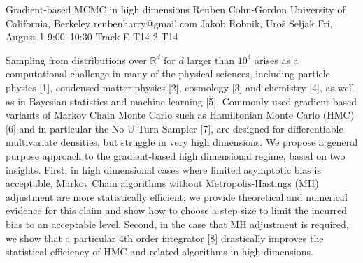 \begin{talk}
  {Gradient-based MCMC in high dimensions}%
  {Reuben Cohn-Gordon}%
  {University of California, Berkeley}%
  {reubenharry@gmail.com}%
  {Jakob Robnik, Uroš Seljak}%
  {}%
  {Fri, August 1 9:00–10:30 Track E}%
  {T14-2}%
  {T14}%
			
Sampling from distributions over $\mathbb{R}^d$ for $d$ larger than $10^4$ arises as a computational challenge in many of the physical sciences, including particle physics [1], condensed matter physics [2], cosmology [3] and chemistry [4], as well as in Bayesian statistics and machine learning [5]. Commonly used gradient-based variants of Markov Chain Monte Carlo such as Hamiltonian Monte Carlo (HMC) [6] and in particular the No U-Turn Sampler [7], are designed for differentiable multivariate densities, but struggle in very high dimensions. 
We propose a general purpose approach to the gradient-based high dimensional regime, based on two insights. First, in high dimensional cases where limited asymptotic bias is acceptable, Markov Chain algorithms without Metropolis-Hastings (MH) adjustment are more statistically efficient; we provide theoretical and numerical evidence for this claim and show how to choose a step size to limit the incurred bias to an acceptable level. Second, in the case that MH adjustment is required, we show that a particular 4th order integrator [8] drastically improves the statistical efficiency of HMC and related algorithms in high dimensions.


\medskip


\end{talk}
